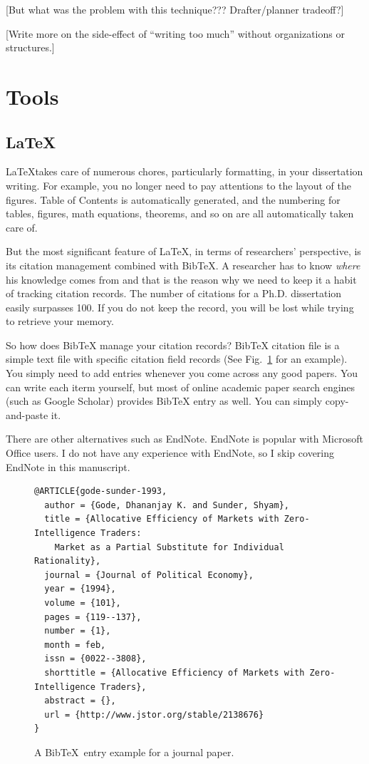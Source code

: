 \documentclass[11pt]{article}
\begin{document}
[But what was the problem with this technique??? Drafter/planner tradeoff?]

[Write more on the side-effect of ``writing too much'' without organizations
or structures.]

\section{Tools}

\subsection{\LaTeX}

\LaTeX takes care of numerous chores, particularly formatting, in your
dissertation writing.  For example, you no longer need to pay attentions to
the layout of the figures.  Table of Contents is automatically generated, and
the numbering for tables, figures, math equations, theorems, and so on are all
automatically taken care of.

But the most significant feature of \LaTeX, in terms of researchers'
perspective, is its citation management combined with BibTeX. A researcher has
to know \emph{where} his knowledge comes from and that is the reason why we
need to keep it a habit of tracking citation records.  The number of citations
for a Ph.D. dissertation easily surpasses 100.  If you do not keep the record,
you will be lost while trying to retrieve your memory.

So how does BibTeX manage your citation records? BibTeX citation file is a
simple text file with specific citation field records (See
Fig.~\ref{fig:bibtex-example} for an example). You simply need to add entries
whenever you come across any good papers. You can write each iterm yourself,
but most of online academic paper search engines (such as Google Scholar)
provides BibTeX entry as well. You can simply copy-and-paste it.

There are other alternatives such as EndNote. EndNote is popular with
Microsoft Office users. I do not have any experience with EndNote, so I skip
covering EndNote in this manuscript. 

\begin{figure}[ht]
    \begin{center}
    \begin{footnotesize}
\begin{verbatim}
@ARTICLE{gode-sunder-1993,
  author = {Gode, Dhananjay K. and Sunder, Shyam},
  title = {Allocative Efficiency of Markets with Zero-Intelligence Traders:
    Market as a Partial Substitute for Individual Rationality},
  journal = {Journal of Political Economy},
  year = {1994},
  volume = {101},
  pages = {119--137}, 
  number = {1},
  month = feb,
  issn = {0022--3808},
  shorttitle = {Allocative Efficiency of Markets with Zero-Intelligence Traders},
  abstract = {},
  url = {http://www.jstor.org/stable/2138676}
}
\end{verbatim}
    \end{footnotesize}
    \end{center}
    \caption{A BibTeX~entry example for a journal paper.}
    \label{fig:bibtex-example}
\end{figure}
\end{document}
